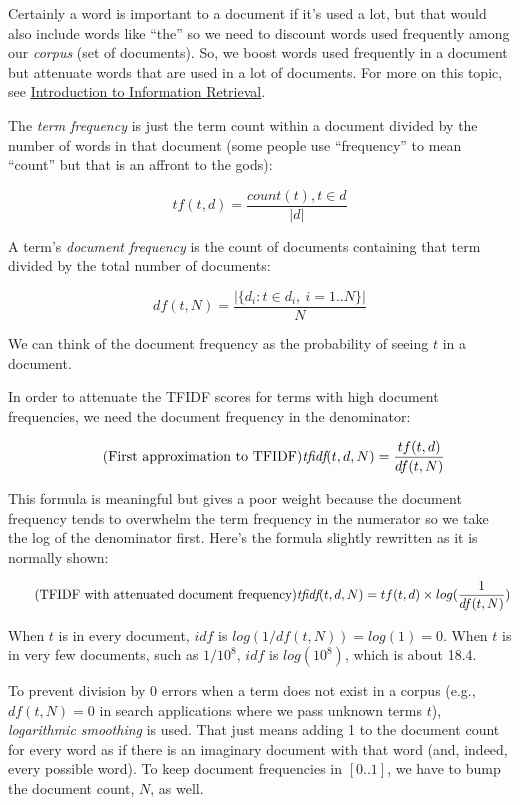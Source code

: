 \begin{fullwidth}
Certainly a word is important to a document if it's used a lot, but that would also include words like ``the'' so we need to discount words used frequently among our {\em corpus} (set of documents). So, we boost words used frequently in a document but attenuate words that are used  in a lot of documents.  For more on this topic, see \href{http://nlp.stanford.edu/IR-book/html/htmledition/term-frequency-and-weighting-1.html}{Introduction to Information Retrieval}.

The {\em term frequency} is just the term count within a document divided by the number of words in that document (some people use ``frequency'' to mean ``count'' but that is an affront to the gods):

\[\tag{Term frequency of term $t$, document $d$}
tf(t,d) = \frac{count(t), t \in d}{|d|}
\]

A term's {\em document frequency} is the count of documents containing that term divided by the total number of documents:

\[\tag{Document frequency of $t$ in $N$ documents}
df(t,N) = \frac{|\{d_i : t \in d_i, \ i = 1..N\}|}{N}
\]

\noindent We can think of the document frequency as the probability of seeing $t$ in a document.

In order to attenuate the TFIDF scores for terms with high document frequencies, we need the document frequency  in the denominator:

\[\tag{First approximation to TFIDF}
\text{\em tfidf}(t,d,N) = \frac{tf(t,d)}{df(t,N)}
\]

This formula is  meaningful but gives a poor weight because the document frequency tends to overwhelm the term frequency in the numerator so we take the log of the denominator first.  Here's the formula slightly rewritten as it is normally shown:

\[\tag{TFIDF with attenuated document frequency}
\text{\em tfidf}(t,d,N) = tf(t,d) \times log(\frac{1}{df(t,N)})
\]

\noindent When $t$ is in every document, $idf$ is $log(1/df(t,N)) = log(1) = 0$. When $t$ is in very few documents, such as $1/10^8$, $idf$ is $log(10^8)$, which is about 18.4.

To prevent division by 0 errors when a term does not exist in a corpus (e.g., $df(t,N)=0$ in search applications where we pass unknown terms $t$), {\em logarithmic smoothing} is used.  That just means adding 1 to the document count for every word as if there is an imaginary document with that word (and, indeed, every possible word). To keep document frequencies in $[0..1]$, we have to bump the document count, $N$, as well.


\end{fullwidth}
